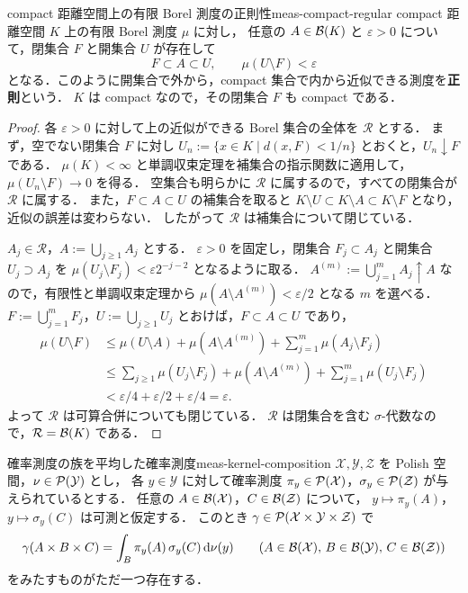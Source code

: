 \begin{lemma}{compact 距離空間上の有限 Borel 測度の正則性}{meas-compact-regular}
  compact 距離空間 $K$ 上の有限 Borel 測度 $\mu$ に対し，
  任意の $A\in\mathcal{B}(K)$ と $\varepsilon>0$ について，閉集合 $F$ と開集合 $U$ が存在して
  \[
    F\subset A\subset U,\qquad \mu(U\setminus F)<\varepsilon
  \]
  となる．このように開集合で外から，compact 集合で内から近似できる測度を\textbf{正則}という．
  $K$ は compact なので，その閉集合 $F$ も compact である．
\end{lemma}

\begin{proof}
  各 $\varepsilon>0$ に対して上の近似ができる Borel 集合の全体を $\mathcal{R}$ とする．
  まず，空でない閉集合 $F$ に対し $U_n:=\{x\in K\mid d(x,F)<1/n\}$ とおくと，$U_n\downarrow F$ である．
  $\mu(K)<\infty$ と単調収束定理を補集合の指示関数に適用して，$\mu(U_n\setminus F)\to0$ を得る．
  空集合も明らかに $\mathcal{R}$ に属するので，すべての閉集合が $\mathcal{R}$ に属する．
  また，$F\subset A\subset U$ の補集合を取ると
  $K\setminus U\subset K\setminus A\subset K\setminus F$ となり，近似の誤差は変わらない．
  したがって $\mathcal{R}$ は補集合について閉じている．

  $A_j\in\mathcal{R}$，$A:=\bigcup_{j\geq1}A_j$ とする．
  $\varepsilon>0$ を固定し，閉集合 $F_j\subset A_j$ と開集合 $U_j\supset A_j$ を
  $\mu(U_j\setminus F_j)<\varepsilon2^{-j-2}$ となるように取る．
  $A^{(m)}:=\bigcup_{j=1}^mA_j\uparrow A$ なので，有限性と単調収束定理から
  $\mu(A\setminus A^{(m)})<\varepsilon/2$ となる $m$ を選べる．
  $F:=\bigcup_{j=1}^mF_j$，$U:=\bigcup_{j\geq1}U_j$ とおけば，$F\subset A\subset U$ であり，
  \[
    \begin{aligned}
      \mu(U\setminus F)
      &\leq\mu(U\setminus A)+\mu(A\setminus A^{(m)})
        +\sum_{j=1}^m\mu(A_j\setminus F_j)\\
      &\leq\sum_{j\geq1}\mu(U_j\setminus F_j)+\mu(A\setminus A^{(m)})
        +\sum_{j=1}^m\mu(U_j\setminus F_j)\\
      &<\varepsilon/4+\varepsilon/2+\varepsilon/4=\varepsilon.
    \end{aligned}
  \]
  よって $\mathcal{R}$ は可算合併についても閉じている．
  $\mathcal{R}$ は閉集合を含む $\sigma$-代数なので，$\mathcal{R}=\mathcal{B}(K)$ である．
\end{proof}

\begin{theorem}{確率測度の族を平均した確率測度}{meas-kernel-composition}
  $\mathcal{X},\mathcal{Y},\mathcal{Z}$ を Polish 空間，$\nu\in\mathcal{P}(\mathcal{Y})$ とし，
  各 $y\in\mathcal{Y}$ に対して確率測度
  $\pi_y\in\mathcal{P}(\mathcal{X})$，$\sigma_y\in\mathcal{P}(\mathcal{Z})$ が与えられているとする．
  任意の $A\in\mathcal{B}(\mathcal{X})$，$C\in\mathcal{B}(\mathcal{Z})$ について，
  $y\mapsto\pi_y(A)$，$y\mapsto\sigma_y(C)$ は可測と仮定する．
  このとき $\gamma\in\mathcal{P}(\mathcal{X}\times\mathcal{Y}\times\mathcal{Z})$ で
  \[
    \gamma(A\times B\times C)
    =\int_B\pi_y(A)\,\sigma_y(C)\,\mathrm{d}\nu(y)
    \qquad(A\in\mathcal{B}(\mathcal{X}),\,B\in\mathcal{B}(\mathcal{Y}),\,C\in\mathcal{B}(\mathcal{Z}))
  \]
  をみたすものがただ一つ存在する．
\end{theorem}

